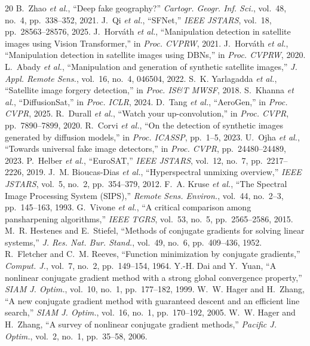 \documentclass[journal]{IEEEtran}
\begin{document}
\begin{thebibliography}{20}
 B.~Zhao \textit{et al.}, ``Deep fake geography?'' \textit{Cartogr. Geogr. Inf. Sci.}, vol.~48, no.~4, pp.~338--352, 2021.
 J.~Qi \textit{et al.}, ``SFNet,'' \textit{IEEE JSTARS}, vol.~18, pp.~28563--28576, 2025.
 J.~Horv\'ath \textit{et al.}, ``Manipulation detection in satellite images using Vision Transformer,'' in \textit{Proc. CVPRW}, 2021.
 J.~Horv\'ath \textit{et al.}, ``Manipulation detection in satellite images using DBNs,'' in \textit{Proc. CVPRW}, 2020.
 L.~Abady \textit{et al.}, ``Manipulation and generation of synthetic satellite images,'' \textit{J. Appl. Remote Sens.}, vol.~16, no.~4, 046504, 2022.
 S.~K. Yarlagadda \textit{et al.}, ``Satellite image forgery detection,'' in \textit{Proc. IS\&T MWSF}, 2018.
 S.~Khanna \textit{et al.}, ``DiffusionSat,'' in \textit{Proc. ICLR}, 2024.
 D.~Tang \textit{et al.}, ``AeroGen,'' in \textit{Proc. CVPR}, 2025.
 R.~Durall \textit{et al.}, ``Watch your up-convolution,'' in \textit{Proc. CVPR}, pp.~7890--7899, 2020.
 R.~Corvi \textit{et al.}, ``On the detection of synthetic images generated by diffusion models,'' in \textit{Proc. ICASSP}, pp.~1--5, 2023.
 U.~Ojha \textit{et al.}, ``Towards universal fake image detectors,'' in \textit{Proc. CVPR}, pp.~24480--24489, 2023.
 P.~Helber \textit{et al.}, ``EuroSAT,'' \textit{IEEE JSTARS}, vol.~12, no.~7, pp.~2217--2226, 2019.
 J.~M. Bioucas-Dias \textit{et al.}, ``Hyperspectral unmixing overview,'' \textit{IEEE JSTARS}, vol.~5, no.~2, pp.~354--379, 2012.
 F.~A. Kruse \textit{et al.}, ``The Spectral Image Processing System (SIPS),'' \textit{Remote Sens. Environ.}, vol.~44, no.~2--3, pp.~145--163, 1993.
 G.~Vivone \textit{et al.}, ``A critical comparison among pansharpening algorithms,'' \textit{IEEE TGRS}, vol.~53, no.~5, pp.~2565--2586, 2015.
 M.~R. Hestenes and E.~Stiefel, ``Methods of conjugate gradients for solving linear systems,'' \textit{J. Res. Nat. Bur. Stand.}, vol.~49, no.~6, pp.~409--436, 1952.
 R.~Fletcher and C.~M. Reeves, ``Function minimization by conjugate gradients,'' \textit{Comput. J.}, vol.~7, no.~2, pp.~149--154, 1964.
 Y.-H. Dai and Y.~Yuan, ``A nonlinear conjugate gradient method with a strong global convergence property,'' \textit{SIAM J. Optim.}, vol.~10, no.~1, pp.~177--182, 1999.
 W.~W. Hager and H.~Zhang, ``A new conjugate gradient method with guaranteed descent and an efficient line search,'' \textit{SIAM J. Optim.}, vol.~16, no.~1, pp.~170--192, 2005.
 W.~W. Hager and H.~Zhang, ``A survey of nonlinear conjugate gradient methods,'' \textit{Pacific J. Optim.}, vol.~2, no.~1, pp.~35--58, 2006.
\end{thebibliography}
\end{document}
